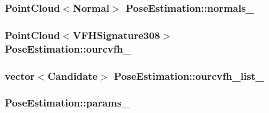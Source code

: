 \hypertarget{classPoseEstimation_ab76eba4186b7a9ea862a266133e831f4}{
\subsubsection[{normals\-\_\-}]{\setlength{\rightskip}{0pt plus 5cm}Point\-Cloud$<$Normal$>$ Pose\-Estimation\-::normals\-\_\-\hspace{0.3cm}{\ttfamily [private]}}}\label{classPoseEstimation_ab76eba4186b7a9ea862a266133e831f4}
\hypertarget{classPoseEstimation_aa817cf97641b997de15fef12a263823f}{
\subsubsection[{ourcvfh\-\_\-}]{\setlength{\rightskip}{0pt plus 5cm}Point\-Cloud$<$V\-F\-H\-Signature308$>$ Pose\-Estimation\-::ourcvfh\-\_\-\hspace{0.3cm}{\ttfamily [private]}}}\label{classPoseEstimation_aa817cf97641b997de15fef12a263823f}
\hypertarget{classPoseEstimation_a478e06f9c9c3711c26376ce1bcd0ef79}{
\subsubsection[{ourcvfh\-\_\-list\-\_\-}]{\setlength{\rightskip}{0pt plus 5cm}vector$<${\bf Candidate}$>$ Pose\-Estimation\-::ourcvfh\-\_\-list\-\_\-\hspace{0.3cm}{\ttfamily [private]}}}\label{classPoseEstimation_a478e06f9c9c3711c26376ce1bcd0ef79}
\hypertarget{classPoseEstimation_a8e62ef2d3f51413b00e6c91aeeab0bfc}{
\subsubsection[{params\-\_\-}]{ Pose\-Estimation\-::params\-\_\-\hspace{0.3cm}{\ttfamily [private]}}}\label{classPoseEstimation_a8e62ef2d3f51413b00e6c91aeeab0bfc}


